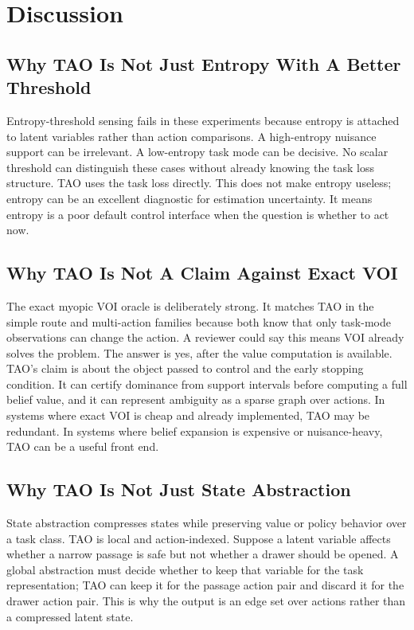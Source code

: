 \documentclass{article}
\begin{document}
\section{Discussion}

\subsection{Why TAO Is Not Just Entropy With A Better Threshold}

Entropy-threshold sensing fails in these experiments because entropy is attached to latent variables rather than action comparisons. A high-entropy nuisance support can be irrelevant. A low-entropy task mode can be decisive. No scalar threshold can distinguish these cases without already knowing the task loss structure. TAO uses the task loss directly. This does not make entropy useless; entropy can be an excellent diagnostic for estimation uncertainty. It means entropy is a poor default control interface when the question is whether to act now.

\subsection{Why TAO Is Not A Claim Against Exact VOI}

The exact myopic VOI oracle is deliberately strong. It matches TAO in the simple route and multi-action families because both know that only task-mode observations can change the action. A reviewer could say this means VOI already solves the problem. The answer is yes, after the value computation is available. TAO's claim is about the object passed to control and the early stopping condition. It can certify dominance from support intervals before computing a full belief value, and it can represent ambiguity as a sparse graph over actions. In systems where exact VOI is cheap and already implemented, TAO may be redundant. In systems where belief expansion is expensive or nuisance-heavy, TAO can be a useful front end.

\subsection{Why TAO Is Not Just State Abstraction}

State abstraction compresses states while preserving value or policy behavior over a task class. TAO is local and action-indexed. Suppose a latent variable affects whether a narrow passage is safe but not whether a drawer should be opened. A global abstraction must decide whether to keep that variable for the task representation; TAO can keep it for the passage action pair and discard it for the drawer action pair. This is why the output is an edge set over actions rather than a compressed latent state.
\end{document}
